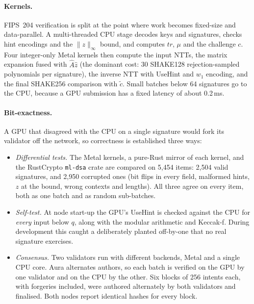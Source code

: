 \documentclass[11pt]{article}
\theoremstyle{definition}
\theoremstyle{remark}
\begin{document}
\paragraph{Kernels.} FIPS~204 verification is split at the point where work becomes fixed-size and
data-parallel. A multi-threaded CPU stage decodes keys and signatures, checks hint encodings and the
$\|z\|_\infty$ bound, and computes $tr$, $\mu$ and the challenge $c$. Four integer-only Metal kernels
then compute the input NTTs, the matrix expansion fused with $\hat{A}\hat{z}$ (the dominant cost:
30 SHAKE128 rejection-sampled polynomials per signature), the inverse NTT with UseHint and
$w_1$ encoding, and the final SHAKE256 comparison with $\tilde{c}$. Small batches below 64
signatures go to the CPU, because a GPU submission has a fixed latency of about 0.2\,ms.

\paragraph{Bit-exactness.} A GPU that disagreed with the CPU on a single signature would fork its
validator off the network, so correctness is established three ways:
\begin{itemize}[leftmargin=*]
  \item \emph{Differential tests.} The Metal kernels, a pure-Rust mirror of each kernel, and the
        RustCrypto \texttt{ml-dsa} crate are compared on 5{,}454 items: 2{,}504 valid signatures,
        and 2{,}950 corrupted ones (bit flips in every field, malformed hints, $z$ at the bound,
        wrong contexts and lengths). All three agree on every item, both as one batch and as
        random sub-batches.
  \item \emph{Self-test.} At node start-up the GPU's UseHint is checked against the CPU for
        \emph{every} input below $q$, along with the modular arithmetic and Keccak-f. During
        development this caught a deliberately planted off-by-one that no real signature
        exercises.
  \item \emph{Consensus.} Two validators run with different backends, Metal and a single CPU core.
        Aura alternates authors, so each batch is verified on the GPU by one validator and on the
        CPU by the other. Six blocks of 256 intents each, with forgeries included, were authored
        alternately by both validators and finalised. Both nodes report identical hashes for every
        block.
\end{itemize}
\end{document}
